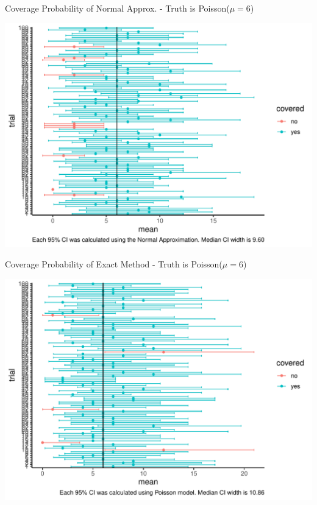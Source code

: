 \documentclass[10pt]{beamer}\usepackage[]{graphicx}\usepackage[]{color}
\makeatletter
\def\maxwidth{ %
  \ifdim\Gin@nat@width>\linewidth
    \linewidth
  \else
    \Gin@nat@width
  \fi
}
\newenvironment{knitrout}{}{} %
\makeatother
\begin{document}
\begin{frame}[fragile]{Coverage Probability of Normal Approx. - Truth is Poisson($\mu=6$)}
	
\begin{knitrout}\tiny
{}\color{fgcolor}

{\centering \includegraphics[width=\maxwidth]{figure/unnamed-chunk-5-1} 

}


\end{knitrout}
	
\end{frame}



\begin{frame}[fragile]{Coverage Probability of Exact Method - Truth is Poisson($\mu=6$)}
	
\begin{knitrout}\tiny
{}\color{fgcolor}

{\centering \includegraphics[width=\maxwidth]{figure/unnamed-chunk-6-1} 

}


\end{knitrout}
	
\end{frame}
\end{document}
